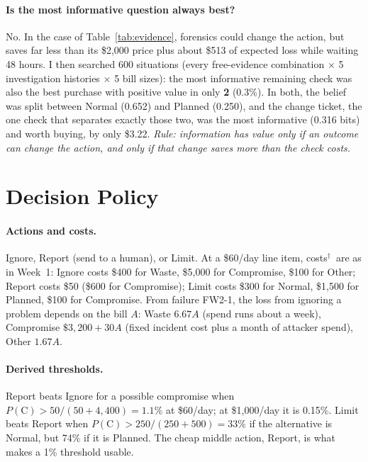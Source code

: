 \documentclass{article}
\newcommand{\hyp}{$^{\dagger}$}
\newcommand{\Pc}{P(\mathrm{C})}
\begin{document}
\paragraph{Is the most informative question always best?} No. In the case of Table~\ref{tab:evidence}, forensics could change the action, but saves far less than its \$2,000 price plus about \$513 of expected loss while waiting 48 hours. I then searched 600 situations (every free-evidence combination $\times$ 5 investigation histories $\times$ 5 bill sizes): the most informative remaining check was also the best purchase with positive value in only \textbf{2} (0.3\%). In both, the belief was split between Normal (0.652) and Planned (0.250), and the change ticket, the one check that separates exactly those two, was the most informative (0.316 bits) and worth buying, by only \$3.22. \emph{Rule: information has value only if an outcome can change the action, and only if that change saves more than the check costs.}

\section{Decision Policy}
\label{sec:policy}

\paragraph{Actions and costs.} Ignore, Report (send to a human), or Limit. At a \$60/day line item, costs\hyp\ are as in Week~1: Ignore costs \$400 for Waste, \$5,000 for Compromise, \$100 for Other; Report costs \$50 (\$600 for Compromise); Limit costs \$300 for Normal, \$1,500 for Planned, \$100 for Compromise. From failure FW2-1, the loss from ignoring a problem depends on the bill $A$: Waste $6.67A$ (spend runs about a week), Compromise $\$3{,}200 + 30A$ (fixed incident cost plus a month of attacker spend), Other $1.67A$.

\paragraph{Derived thresholds.} Report beats Ignore for a possible compromise when $\Pc > 50/(50+4{,}400) = 1.1\%$ at \$60/day; at \$1,000/day it is 0.15\%. Limit beats Report when $\Pc > 250/(250+500) = 33\%$ if the alternative is Normal, but 74\% if it is Planned. The cheap middle action, Report, is what makes a 1\% threshold usable.
\end{document}
